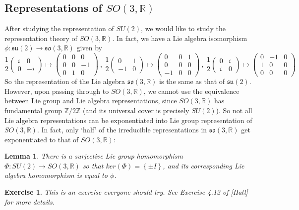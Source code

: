 \documentclass[11pt]{article}
\newtheorem{lemma}[theorem]{Lemma}
\newtheorem{exercise}[theorem]{Exercise}
\newcommand{\bb}[1]{\mathbb{#1}}
\newcommand{\mf}[1]{\mathfrak{#1}}
\begin{document}
\subsection{Representations of $SO(3,\bb{R})$}
After studying the representation of $SU(2)$, we would like to study the representation theory of $SO(3,\bb{R})$. In fact, we have a Lie algebra isomorphism $\phi: \mf{su}(2) \to \mf{so}(3,\bb{R})$ given by\small{
$$\frac{1}{2} \left( \begin{array}{cc}
i & 0 \\
0 & -i \end{array} \right) \mapsto \left( \begin{array}{ccc}
0 & 0 & 0 \\
0& 0& -1\\
0 & 1 & 0 \end{array} \right)\ ,\ \frac{1}{2} \left( \begin{array}{cc}
0 & 1 \\
-1 & 0 \end{array} \right) \mapsto \left( \begin{array}{ccc}
0 & 0 & 1 \\
0& 0& 0\\
-1 & 0 & 0 \end{array} \right)\ ,\ \frac{1}{2} \left( \begin{array}{cc}
0 & i \\
i & 0 \end{array} \right) \mapsto \left( \begin{array}{ccc}
0 & -1 & 0 \\
1& 0& 0\\
0 & 0 & 0 \end{array} \right)$$}
So the representation of the Lie algebra $\mf{so}(3,\bb{R})$ is the same as that of $\mf{su}(2)$. However, upon passing through to $SO(3,\bb{R})$, we cannot use the equivalence between Lie group and Lie algebra representations, since $SO(3,\bb{R})$ has fundamental group $\bb{Z}/2\bb{Z}$ (and its universal cover is precisely $SU(2)$). So not all Lie algebra representations can be exponentiated into Lie group representation of $SO(3,\bb{R})$. In fact, only `half' of the irreducible representations in $\mf{so}(3,\bb{R})$ get exponentiated to that of $SO(3,\bb{R})$:
\begin{lemma}
There is a surjective Lie group homomorphism $\Phi: SU(2) \to SO(3,\bb{R})$ so that $ker(\Phi) = \left\{\pm I\right\}$, and its corresponding Lie algebra homomorphism is equal to $\phi$.
\end{lemma}
\begin{exercise}
This is an exercise everyone should try. See Exercise 4.12 of [Hall] for more details.
\end{exercise}
\end{document}
